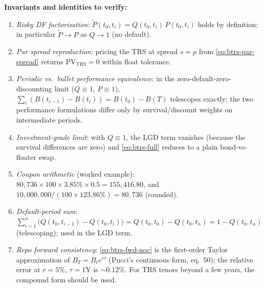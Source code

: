 \documentclass[11pt,a4paper]{article}
\begin{document}
\begin{validation}
\textbf{Invariants and identities to verify:}
\begin{enumerate}[noitemsep]
  \item \emph{Risky DF factorisation}: $\widetilde P(t_0, t_i) =
        Q(t_0, t_i)\, P(t_0, t_i)$ holds by definition; in
        particular $\widetilde P \to P$ as $Q \to 1$ (no default).
  \item \emph{Par spread reproduction}: pricing the TRS at spread
        $s = p$ from \eqref{eq:btrs-par-spread} returns
        $\mathrm{PV}_{\mathrm{TRS}} = 0$ within float tolerance.
  \item \emph{Periodic vs.\ bullet performance equivalence}: in the
        zero-default-zero-discounting limit ($Q \equiv 1$, $P \equiv 1$),
        $\sum_i (B(t_{i-1}) - B(t_i)) = B(t_0) - B(T)$ telescopes
        exactly; the two performance formulations differ only by
        survival/discount weights on intermediate periods.
  \item \emph{Investment-grade limit}: with $Q \equiv 1$, the LGD term
        vanishes (because the survival differences are zero) and
        \eqref{eq:btrs-full} reduces to a plain bond-vs-floater swap.
  \item \emph{Coupon arithmetic} (worked example): $80{,}736 \times
        100 \times 3.85\% \times 0.5 = 155{,}416.80$, and
        $10{,}000{,}000 / (100 \times 123.86\%) = 80{,}736$ (rounded).
  \item \emph{Default-period sum}: $\sum_{i=1}^{n}
        \bigl(Q(t_0, t_{i-1}) - Q(t_0, t_i)\bigr) = Q(t_0, t_0) -
        Q(t_0, t_n) = 1 - Q(t_0, t_n)$ (telescoping); used in the
        LGD term.
  \item \emph{Repo forward consistency}: \eqref{eq:btrs-fwd-noc} is
        the first-order Taylor approximation of $B_T = B_t e^{r\tau}$
        (Pucci's continuous form, eq.~50); the relative error at
        $r = 5\%$, $\tau = 1$Y is $\sim 0.12\%$. For TRS tenors
        beyond a few years, the compound form should be used.
\end{enumerate}
\end{validation}

\end{document}
